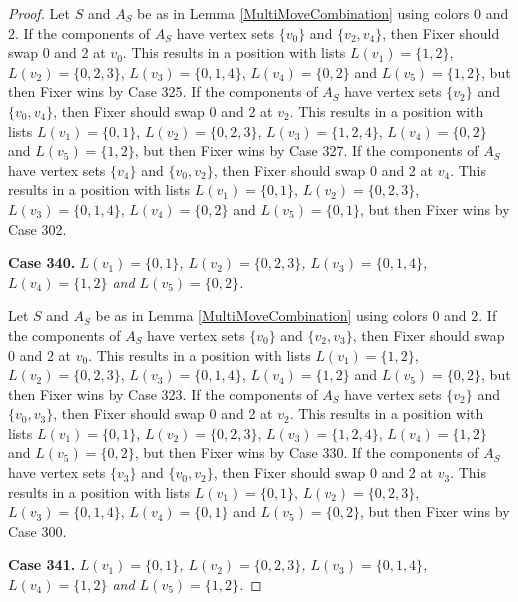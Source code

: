\documentclass[12pt]{amsart}
\theoremstyle{plain}
\theoremstyle{definition}
\theoremstyle{remark}
\begin{document}
\begin{proof}
Let $S$ and $A_S$ be as in Lemma \ref{MultiMoveCombination} using colors $0$ and $2$. If the components of $A_S$ have vertex sets $\{v_0\}$ and $\{v_2, v_4\}$, then Fixer should swap 0 and 2 at $v_0$. This results in a position with lists $L(v_1) = \{1, 2\}$, $L(v_2) = \{0, 2, 3\}$, $L(v_3) = \{0, 1, 4\}$, $L(v_4) = \{0, 2\}$ and $L(v_5) = \{1, 2\}$, but then Fixer wins by Case 325. If the components of $A_S$ have vertex sets $\{v_2\}$ and $\{v_0, v_4\}$, then Fixer should swap 0 and 2 at $v_2$. This results in a position with lists $L(v_1) = \{0, 1\}$, $L(v_2) = \{0, 2, 3\}$, $L(v_3) = \{1, 2, 4\}$, $L(v_4) = \{0, 2\}$ and $L(v_5) = \{1, 2\}$, but then Fixer wins by Case 327. If the components of $A_S$ have vertex sets $\{v_4\}$ and $\{v_0, v_2\}$, then Fixer should swap 0 and 2 at $v_4$. This results in a position with lists $L(v_1) = \{0, 1\}$, $L(v_2) = \{0, 2, 3\}$, $L(v_3) = \{0, 1, 4\}$, $L(v_4) = \{0, 2\}$ and $L(v_5) = \{0, 1\}$, but then Fixer wins by Case 302. 

\noindent\textbf{Case 340.  }\textit{$L(v_1) = \{0, 1\}$, $L(v_2) = \{0, 2, 3\}$, $L(v_3) = \{0, 1, 4\}$, $L(v_4) = \{1, 2\}$ and $L(v_5) = \{0, 2\}$.}

Let $S$ and $A_S$ be as in Lemma \ref{MultiMoveCombination} using colors $0$ and $2$. If the components of $A_S$ have vertex sets $\{v_0\}$ and $\{v_2, v_3\}$, then Fixer should swap 0 and 2 at $v_0$. This results in a position with lists $L(v_1) = \{1, 2\}$, $L(v_2) = \{0, 2, 3\}$, $L(v_3) = \{0, 1, 4\}$, $L(v_4) = \{1, 2\}$ and $L(v_5) = \{0, 2\}$, but then Fixer wins by Case 323. If the components of $A_S$ have vertex sets $\{v_2\}$ and $\{v_0, v_3\}$, then Fixer should swap 0 and 2 at $v_2$. This results in a position with lists $L(v_1) = \{0, 1\}$, $L(v_2) = \{0, 2, 3\}$, $L(v_3) = \{1, 2, 4\}$, $L(v_4) = \{1, 2\}$ and $L(v_5) = \{0, 2\}$, but then Fixer wins by Case 330. If the components of $A_S$ have vertex sets $\{v_3\}$ and $\{v_0, v_2\}$, then Fixer should swap 0 and 2 at $v_3$. This results in a position with lists $L(v_1) = \{0, 1\}$, $L(v_2) = \{0, 2, 3\}$, $L(v_3) = \{0, 1, 4\}$, $L(v_4) = \{0, 1\}$ and $L(v_5) = \{0, 2\}$, but then Fixer wins by Case 300. 

\noindent\textbf{Case 341.  }\textit{$L(v_1) = \{0, 1\}$, $L(v_2) = \{0, 2, 3\}$, $L(v_3) = \{0, 1, 4\}$, $L(v_4) = \{1, 2\}$ and $L(v_5) = \{1, 2\}$.}


\end{proof}
\end{document}
